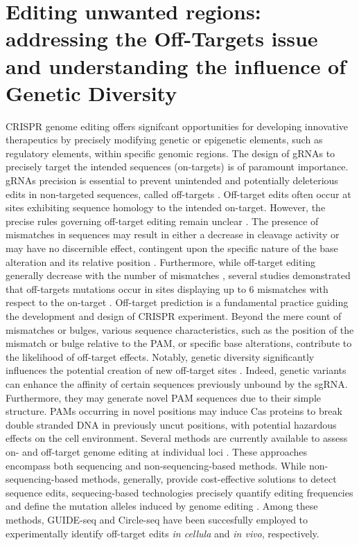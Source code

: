 \documentclass[a4paper, titlepage, openright]{book}
\begin{document}
\section{Editing unwanted regions: addressing the Off-Targets issue and understanding the influence of Genetic Diversity}\label{section:offtarget-problem}
CRISPR genome editing offers signifcant opportunities for developing innovative therapeutics by precisely modifying genetic or epigenetic elements, such as regulatory elements, within specific genomic regions. The design of gRNAs to precisely target the intended sequences (on-targets) is of paramount importance. gRNAs precision is essential to prevent unintended and potentially deleterious edits in non-targeted sequences, called off-targets \citep{pattanayak2013high,cho2014analysis}. Off-target edits often occur at sites exhibiting sequence homology to the intended on-target. However, the precise rules governing off-target editing remain unclear \citep{tycko2016methods}. The presence of mismatches in sequences may result in either a decrease in cleavage activity or may have no discernible effect, contingent upon the specific nature of the base alteration and its relative position \citep{doench2014rational,doench2016optimized}. Furthermore, while off-target editing generally decrease with the number of mismatches \citep{cho2014analysis}, several studies demonstrated that off-targets mutations occur in sites displaying up to 6 mismatches with respect to the on-target \citep{tsai2015guide}. Off-target prediction is a fundamental practice guiding the development and design of CRISPR experiment. Beyond the mere count of mismatches or bulges, various sequence characteristics, such as the position of the mismatch or bulge relative to the PAM, or specific base alterations, contribute to the likelihood of off-target effects. Notably, genetic diversity significantly influences the potential creation of new off-target sites \citep{scott2017implications}. Indeed, genetic variants can enhance the affinity of certain sequences previously unbound by the sgRNA. Furthermore, they may generate novel PAM sequences due to their simple structure. PAMs occurring in novel positions may induce Cas proteins to break double stranded DNA in previously uncut positions, with potential hazardous effects on the cell environment. Several methods are currently available to assess on- and off-target genome editing at individual loci \citep{clement2020technologies}. These approaches encompass both sequencing and non-sequencing-based methods. While non-sequencing-based methods, generally, provide cost-effective solutions to detect sequence edits, sequecing-based technologies precisely quantify editing frequencies and define the mutation alleles induced by genome editing \citep{clement2020technologies}. Among these methods, GUIDE-seq \citep{tsai2015guide} and Circle-seq \citep{tsai2017circle} have been succesfully employed to experimentally identify off-target edits \emph{in cellula} and \emph{in vivo}, respectively.  
\end{document}

